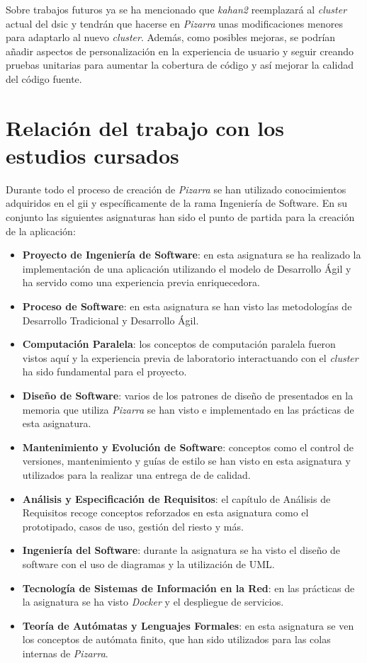 \documentclass[11pt,spanish,listoffigures,listoftables]{tfgetsinf}
\begin{document}
Sobre trabajos futuros ya se ha mencionado que \textit{kahan2} reemplazará al \textit{cluster} actual del \acrshort{dsic} y tendrán que hacerse en \textit{Pizarra} unas modificaciones menores para adaptarlo al nuevo \textit{cluster}. Además, como posibles mejoras, se podrían añadir aspectos de personalización en la experiencia de usuario y seguir creando pruebas unitarias para aumentar la cobertura de código y así mejorar la calidad del código fuente.


\section{Relación del trabajo con los estudios cursados}

Durante todo el proceso de creación de \textit{Pizarra} se han utilizado conocimientos adquiridos en el \acrshort{gii} y específicamente de la rama Ingeniería de Software. En su conjunto las siguientes asignaturas han sido el punto de partida para la creación de la aplicación:

\begin{itemize}
	\item \textbf{Proyecto de Ingeniería de Software}: en esta asignatura se ha realizado la implementación de una aplicación utilizando el modelo de Desarrollo Ágil y ha servido como una experiencia previa enriquecedora.
	\item \textbf{Proceso de Software}: en esta asignatura se han visto las metodologías de Desarrollo Tradicional y Desarrollo Ágil.
	\item \textbf{Computación Paralela}: los conceptos de computación paralela fueron vistos aquí y la experiencia previa de laboratorio interactuando con el \textit{cluster} \kahan ha sido fundamental para el proyecto.
	\item \textbf{Diseño de Software}: varios de los patrones de diseño de  presentados en la memoria que utiliza \textit{Pizarra} se han visto e implementado en las prácticas de esta asignatura. 
	\item \textbf{Mantenimiento y Evolución de Software}: conceptos como el control de versiones, mantenimiento y guías de estilo se han visto en esta asignatura y utilizados para la realizar una entrega de  de calidad.
	\item \textbf{Análisis y Especificación de Requisitos}: el capítulo de Análisis de Requisitos recoge conceptos reforzados en esta asignatura como el prototipado, casos de uso, gestión del riesto y más.
	\item \textbf{Ingeniería del Software}: durante la asignatura se ha visto el diseño de software con el uso de diagramas y la utilización de UML.
	\item \textbf{Tecnología de Sistemas de Información en la Red}: en las prácticas de la asignatura se ha visto \textit{Docker} y el despliegue de servicios.
	\item \textbf{Teoría de Autómatas y Lenguajes Formales}: en esta asignatura se ven los conceptos de autómata finito, que han sido utilizados para las colas internas de \textit{Pizarra}.
\end{itemize}
\end{document}
